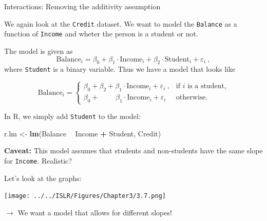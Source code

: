 \documentclass[10pt,ignorenonframetext,]{beamer}
\newenvironment{Shaded}{\begin{snugshade}}{\end{snugshade}}
\newcommand{\KeywordTok}[1]{\textcolor[rgb]{0.13,0.29,0.53}{\textbf{#1}}}
\newcommand{\StringTok}[1]{\textcolor[rgb]{0.31,0.60,0.02}{#1}}
\newcommand{\OperatorTok}[1]{\textcolor[rgb]{0.81,0.36,0.00}{\textbf{#1}}}
\newcommand{\NormalTok}[1]{#1}
\begin{document}
\begin{frame}[fragile]

\begin{block}{Interactions: Removing the additivity assumption}

\vspace{2mm}

We again look at the \texttt{Credit} dataset. We want to model the
\texttt{Balance} as a function of \texttt{Income} and wheter the person
is a student or not.

\vspace{2mm}

The model is given as
\[\text{Balance}_i = \beta_0 + \beta_1 \cdot \text{Income}_i + \beta_2 \cdot \text{Student}_i + \varepsilon_i \ ,\]
where \texttt{Student} is a binary variable. Thus we have a model that
looks like

\begin{equation*}
\text{Balance}_i = \left\{ 
\begin{array}{ll}
\beta_0 + \beta_2 + \beta_1 \cdot \text{Income}_i  + \varepsilon_i \ ,  & \text{if $i$ is a student,}\\
\beta_0 + \qquad \; \beta_1 \cdot \text{Income}_i  + \varepsilon_i  & \text{otherwise.}
\end{array}
\right.
\end{equation*}

In R, we simply add \texttt{Student} to the model: \scriptsize

\begin{Shaded}
\begin{Highlighting}[]
\NormalTok{r.lm <-}\StringTok{ }\KeywordTok{lm}\NormalTok{(Balance }\OperatorTok{~}\StringTok{ }\NormalTok{Income }\OperatorTok{+}\StringTok{ }\NormalTok{Student, Credit)}
\end{Highlighting}
\end{Shaded}

\normalsize

\textbf{Caveat:} This model assumes that students and non-students have
the same slope for \texttt{Income}. Realistic?

\end{block}

\end{frame}

\begin{frame}

Let's look at the graphs:

\texttt{[image: ../../ISLR/Figures/Chapter3/3.7.png]}

\(\rightarrow\) We want a model that allows for different slopes!

\end{frame}
\end{document}
